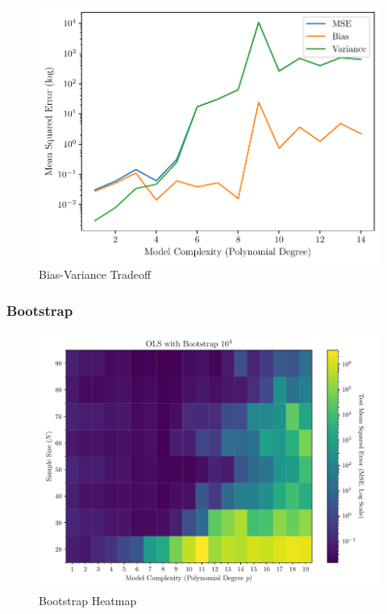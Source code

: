 \documentclass[twocolumn,aps]{revtex4}
\begin{document}
\begin{figure}[h]
    \centering
    \includegraphics[width=.95 \linewidth]{Figures/bias_variance_tradeoff.pdf}
    \caption{Bias-Variance Tradeoff}
    \label{fig:biasvariance}
\end{figure}

\subsubsection{Bootstrap}

\begin{figure}[h]
    \centering
    \includegraphics[width=.95 \linewidth]{Figures/Bootstrap_Heatmap.pdf}
    \caption{Bootstrap Heatmap}
    \label{fig:BootstrapHeatmap}
\end{figure}
\end{document}

